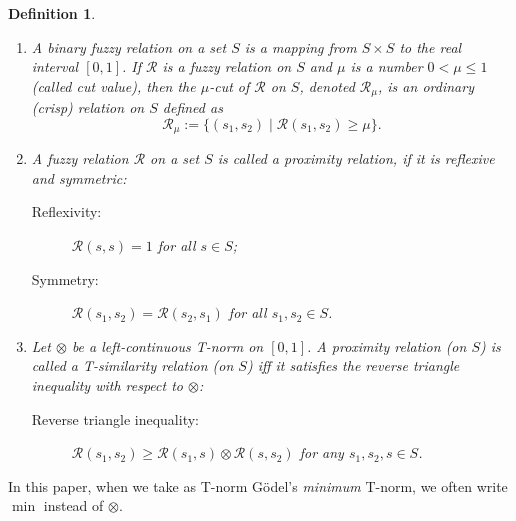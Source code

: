 \documentclass{article}
\newcommand{\cR}{{\mathcal R}}
\def\cut{\mu}
\newtheorem{definition}{Definition}[section]
\begin{document}

\begin{definition}\begin{enumerate}
\item A binary \emph{fuzzy relation} on a set $S$ is a mapping from $S\times S$ to the real interval $[0,1]$. If $\cR$ is a fuzzy relation on $S$ and $\cut$ is a number $0<\cut \le 1$ (called \emph{cut value}), then the \emph{$\cut$-cut} of $\cR$ on $S$, denoted $\cR_\cut$, is an ordinary (crisp) relation on $S$ defined as
\[
  \cR_\cut := \{(s_1,s_2) \mid \cR(s_1,s_2) \ge \cut \}.
\]
\item A fuzzy relation $\cR$ on a set $S$ is called a \emph{proximity relation}, if it is reflexive and symmetric:
\begin{description}
  \item[Reflexivity:] $\cR(s,s)=1$ for all $s\in S$;
  \item[Symmetry:] $\cR(s_1,s_2)=\cR(s_2,s_1)$ for all $s_1,s_2\in S$.
\end{description}

\item Let $\otimes$ be a left-continuous T-norm on $[0,1]$.%
A proximity relation (on $S$) is
called a \emph{T-similarity relation} (on $S$) iff it satisfies the reverse
triangle inequality with respect to $\otimes$:
\begin{description}
  \item[Reverse triangle inequality:] $\cR(s_1,s_2)\ge \cR(s_1,s) \otimes \cR(s,s_2)$ for any $s_1,s_2,s\in S$.
\end{description}
\end{enumerate}
\end{definition}

In this paper, when we take as T-norm G\"odel's \emph{minimum} T-norm, we often write $\min$ instead of $\otimes$. 
\end{document}
